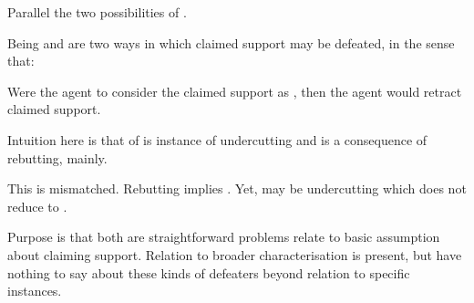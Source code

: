 \begin{note}
  Parallel the two possibilities of \ideaCSA{}.
\end{note}

\begin{note}
  Being \mistaken{-} and \misled{} are two ways in which claimed support may be defeated, in the sense that:

  Were the agent to consider the claimed support as \mom{}, then the agent would retract claimed support.
\end{note}

\begin{note}
  Intuition here is that of \mistaken{} is instance of undercutting and \misled{} is a consequence of rebutting, mainly.

  This is mismatched.
  Rebutting implies \misled{}.
  Yet, may be undercutting which does not reduce to \mistaken{}.

  Purpose is that both are straightforward problems relate to basic assumption about claiming support.
  Relation to broader characterisation is present, but have nothing to say about these kinds of defeaters beyond relation to specific instances.
\end{note}

